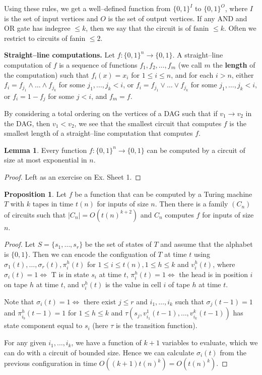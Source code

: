 \documentclass{article}
\theoremstyle{definition}
\newtheorem{lemma}[theorem]{Lemma}
\newtheorem{prop}[theorem]{Proposition}
\begin{document}
Using these rules, we get a well--defined function from $\{0,1\}^{I}$ to $\{0,1\}^{O}$, where $I$ is the set of input vertices and $O$ is the set of output vertices. If any AND and OR gate has indegree $\le k$, then we say that the circuit is of $\text{fanin } \le k$. Often we restrict to circuits of fanin $\le 2$.
\vspace{1mm}
 
\textbf{Straight--line computations.} Let $f : \{0,1\}^n \to \{0,1\}$. A straight--line computation of $f$ is a sequence of functions $f_1,f_2,\ldots,f_m$ (we call $m$ the \textbf{length} of the computation) such that $f_i(x) = x_i$ for $1\le i\le n$, and for each $i>n$, either $f_i = f_{j_1} \wedge \ldots \wedge f_{j_k}$ for some $j_1,\ldots,j_k < i$, or $f_i = f_{j_1} \vee \ldots \vee f_{j_k}$ for some $j_1,\ldots,j_k < i$, or $f_i = 1 - f_j$ for some $j<i$, and $f_m = f$.
\vspace{1mm}
 
By considering a total ordering on the vertices of a DAG such that if $v_1 \to v_2$ in the DAG, then $v_1 < v_2$, we see that the smallest circuit that computes $f$ is the smallest length of a straight--line computation that computes $f$.

\begin{lemma}
    Every function $f : \{0,1\}^n \to \{0,1\}$ can be computed by a circuit of size at most exponential in $n$.
\end{lemma}
\begin{proof}
    Left as an exercise on Ex. Sheet 1. 
\end{proof}
\begin{prop}
    Let $f$ be a function that can be computed by a Turing machine $T$ with $k$ tapes in time $t(n)$ for inputs of size $n$. Then there is a family $(C_n)$ of circuits such that $|C_n| = O(t(n)^{k+2})$ and $C_n$ computes $f$ for inputs of size $n$. 
\end{prop}
\begin{proof}
    Let $S = \{s_1,\ldots,s_r\}$ be the set of states of $T$ and assume that the alphabet is $\{0,1\}$. Then we can encode the configuation of $T$ at time $t$ using $\sigma_1(t),\ldots,\sigma_r(t), \pi_{i}^h(t)$ for $1\le i\le t(n),1\le h\le k$ and $v_i^h(t)$, where $\sigma_i(t) = 1 \iff$ T is in state $s_i$ at time $t$, $\pi_i^h(t) = 1 \iff$ the head is in position $i$ on tape $h$ at time $t$, and $v_i^h(t)$ is the value in cell $i$ of tape $h$ at time $t$.
    \vspace{1mm}
     
    Note that $\sigma_i(t) = 1 \iff$ there exist $j\le r$ and $i_1,\ldots,i_k$ such that $\sigma_j(t-1)=1$ and $\pi_{i_b}^h(t-1) = 1$ for $1\le h\le k$ and $\tau(s_j, v_{i_1}^1(t-1), \ldots, v_{i_k}^k(t-1))$ has state component equal to $s_i$ (here $\tau$ is the transition function).  
    \vspace{1mm}
     
    For any given $i_1,\ldots,i_k$, we have a function of $k+1$ variables to evaluate, which we can do with a circuit of bounded size. Hence we can calculate $\sigma_i(t)$ from the previous configuration in time $O((k+1)t(n)^k) = O(t(n)^k)$.
\end{proof}
\end{document}
